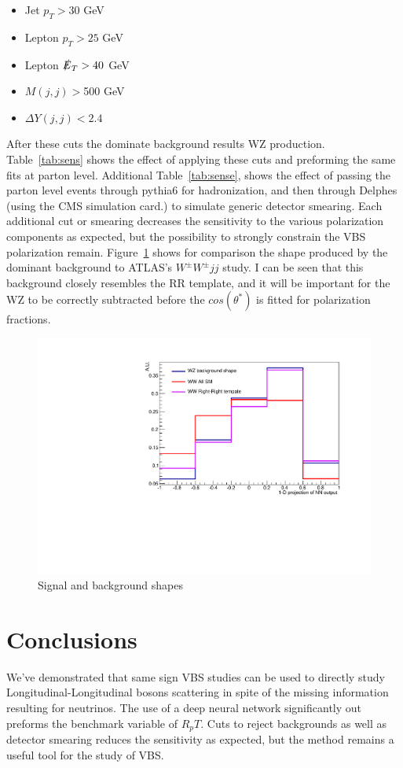 \documentclass[10pt,twocolumn]{article}
\def\ssWW{\ensuremath{ W^{\pm}W^{\pm}jj }\xspace}
\def\ts{\ensuremath{ \theta^{*} }\xspace}
\def\cts{\ensuremath{ cos(\ts) }\xspace}
\begin{document}
\begin{itemize}
\item Jet $p_T > 30$ GeV
\item Lepton $p_T > 25$ GeV
\item Lepton $\slashed{E}_T > 40$ GeV
\item $M(j,j) > $500 GeV
\item $\Delta Y(j,j) < 2.4 $
\end{itemize}

After these cuts the dominate background results WZ production. Table~\ref{tab:sens} shows the effect of applying these cuts 
and preforming the same fits at parton level. Additional Table~\ref{tab:sense}, shows the effect of passing the parton level events
through pythia6 for hadronization, and then through Delphes (using the CMS simulation card.) to simulate generic detector smearing. Each additional cut or smearing
decreases the sensitivity to the various polarization components as expected, but the possibility to strongly constrain the VBS polarization remain. Figure~\ref{sig_bkg} shows for comparison the shape produced by the dominant background to ATLAS's \ssWW study. I can be seen that this background closely resembles the RR template, and it will be important for the WZ to be correctly subtracted before the \cts is fitted for polarization fractions.


\begin{figure}
\includegraphics[width=.45\textwidth]{./fig/sig_bkg.pdf}
\caption{\label{sig_bkg} Signal and background shapes}

\end{figure}

 


\section{Conclusions}

We've demonstrated that same sign VBS studies can be used to directly study Longitudinal-Longitudinal bosons scattering in spite
of the missing information resulting for neutrinos. The use of a deep neural network significantly out preforms the benchmark variable
of $R_pT$. Cuts to reject backgrounds as well as detector smearing reduces the sensitivity as expected, but the method remains a useful tool
for the study of VBS.
\end{document}
